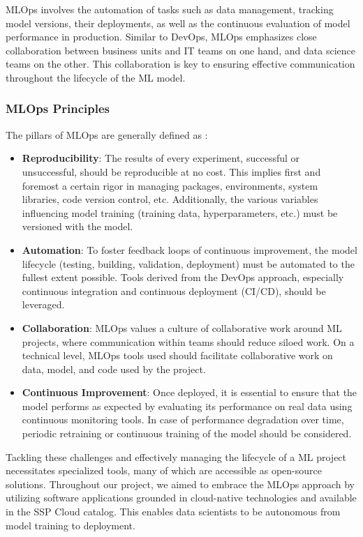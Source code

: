 MLOps involves the automation of tasks such as data management, tracking model versions, their deployments, as well as the continuous evaluation of model performance in production. Similar to DevOps, MLOps emphasizes close collaboration between business units and IT teams on one hand, and data science teams on the other. This collaboration is key to ensuring effective communication throughout the lifecycle of the ML model.

\subsubsection{MLOps Principles}

The pillars of MLOps\cite{kreuzberger2023machine} are generally defined as :

\begin{itemize}
    \item \textbf{Reproducibility}: The results of every experiment, successful or unsuccessful, should be reproducible at no cost. This implies first and foremost a certain rigor in managing packages, environments, system libraries, code version control, etc. Additionally, the various variables influencing model training (training data, hyperparameters, etc.) must be versioned with the model.
    
    \item \textbf{Automation}: To foster feedback loops of continuous improvement, the model lifecycle (testing, building, validation, deployment) must be automated to the fullest extent possible. Tools derived from the DevOps approach, especially continuous integration and continuous deployment (CI/CD), should be leveraged.
    
    \item \textbf{Collaboration}: MLOps values a culture of collaborative work around ML projects, where communication within teams should reduce siloed work. On a technical level, MLOps tools used should facilitate collaborative work on data, model, and code used by the project.
    
    \item \textbf{Continuous Improvement}: Once deployed, it is essential to ensure that the model performs as expected by evaluating its performance on real data using continuous monitoring tools. In case of performance degradation over time, periodic retraining or continuous training of the model should be considered.
\end{itemize}


Tackling these challenges and effectively managing the lifecycle of a ML project necessitates specialized tools, many of which are accessible as open-source solutions. Throughout our project, we aimed to embrace the MLOps approach by utilizing software applications grounded in cloud-native technologies and available in the SSP Cloud catalog. This enables data scientists to be autonomous from model training to deployment.

